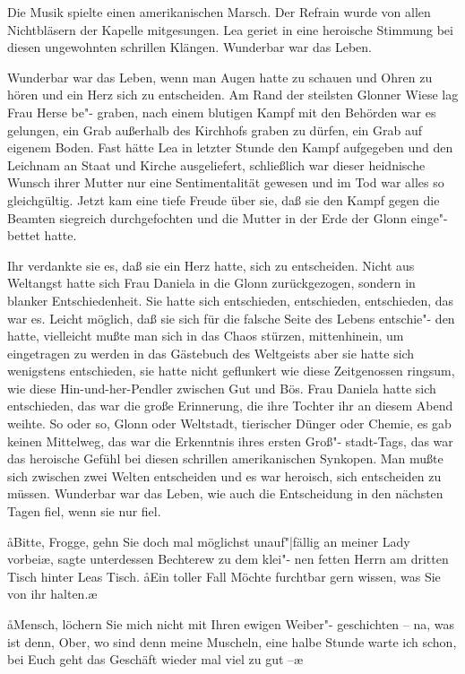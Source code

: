 Die Musik spielte einen amerikanischen Marsch. Der Refrain
wurde von allen Nichtbläsern der Kapelle mitgesungen. Lea
geriet in eine heroische Stimmung bei diesen ungewohnten
schrillen Klängen. Wunderbar war das Leben.

Wunderbar war das Leben, wenn man Augen hatte zu
schauen und Ohren zu hören und ein Herz sich zu entscheiden.
Am Rand der steilsten Glonner Wiese lag Frau Herse be"-%
graben, nach einem blutigen Kampf mit den Behörden war
es gelungen, ein Grab außerhalb des Kirchhofs graben zu
dürfen, ein Grab auf eigenem Boden. Fast hätte Lea in letzter
Stunde den Kampf aufgegeben und den Leichnam an Staat
und Kirche ausgeliefert, schließlich war dieser heidnische
Wunsch ihrer Mutter nur eine Sentimentalität gewesen und
im Tod war alles so gleichgültig. Jetzt kam eine tiefe Freude
über sie, daß sie den Kampf gegen die Beamten siegreich
durchgefochten und die Mutter in der Erde der Glonn einge"-%
bettet hatte.

Ihr verdankte sie es, daß sie ein Herz hatte, sich zu entscheiden.
Nicht aus Weltangst hatte sich Frau Daniela in die Glonn
zurückgezogen, sondern in blanker Entschiedenheit. Sie hatte
sich entschieden, entschieden, entschieden, das war es. Leicht
möglich, daß sie sich für die falsche Seite des Lebens entschie"-%
den hatte, vielleicht mußte man sich in das Chaos stürzen,
mittenhinein, um eingetragen zu werden in das Gästebuch
des Weltgeists\dopp{} aber sie hatte sich wenigstens entschieden, sie
hatte nicht geflunkert wie diese Zeitgenossen ringsum, wie
diese Hin-und-her-Pendler zwischen Gut und Bös. Frau
Daniela hatte sich entschieden, das war die große Erinnerung,
die ihre Tochter ihr an diesem Abend weihte. So oder so,
Glonn oder Weltstadt, tierischer Dünger oder Chemie, es gab
keinen Mittelweg, das war die Erkenntnis ihres ersten Groß"-%
stadt-Tags, das war das heroische Gefühl bei diesen schrillen
amerikanischen Synkopen. Man mußte sich zwischen zwei
Welten entscheiden und es war heroisch, sich entscheiden zu
müssen. Wunderbar war das Leben, wie auch die Entscheidung
in den nächsten Tagen fiel, wenn sie nur fiel.

\aa{}Bitte, Frogge, gehn Sie doch mal möglichst unauf"|fällig an
meiner Lady vorbei\ae{}, sagte unterdessen Bechterew zu dem klei"-%
nen fetten Herrn am dritten Tisch hinter Leas Tisch. \aa{}Ein toller
Fall\ausr{} Möchte furchtbar gern wissen, was Sie von ihr halten.\ae{}

\aa{}Mensch, löchern Sie mich nicht mit Ihren ewigen Weiber"-%
geschichten -- na, was ist denn, Ober, wo sind denn meine
Muscheln, eine halbe Stunde warte ich schon, bei Euch geht
das Geschäft wieder mal viel zu gut --\ae{}

